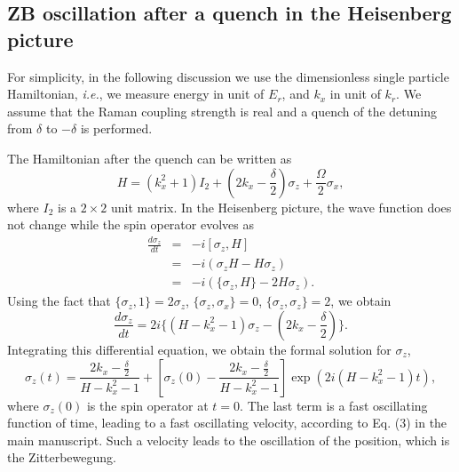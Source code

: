 \documentclass[prl,aps,twocolumn,showpacs,floatfix]{revtex4-1}
\begin{document}
\begin{appendix}
\begin{widetext}

\section{ZB oscillation after a quench in the Heisenberg picture}

For simplicity, in the following discussion we use the dimensionless
single particle Hamiltonian, \textit{i.e.}, we measure energy in
unit of $E_{r}$, and $k_{x}$ in unit of $k_{r}$. We assume that the
Raman coupling strength is real and a quench of the detuning from
$\delta$ to $-\delta$ is performed.

The Hamiltonian after the quench can be written as
\begin{equation}
H=\left( k_{x}^{2}+1\right) I_{2}+(2k_{x}-\frac{\delta }{2})\sigma _{z}+%
\frac{\Omega }{2}\sigma _{x},
\end{equation}%
where $I_{2}$ is a $2\times 2$ unit matrix. In the Heisenberg
picture, the wave function does not change while the spin operator
evolves as
\begin{eqnarray}
\frac{d\sigma _{z}}{dt} &=&-i[\sigma _{z},H] \\
&=&-i(\sigma _{z}H-H\sigma _{z}) \\
&=&-i(\{\sigma _{z},H\}-2H\sigma _{z}).
\end{eqnarray}%
Using the fact that $\{\sigma _{z},1\}=2\sigma _{z}$, $\{\sigma _{z},\sigma
_{x}\}=0$, $\{\sigma _{z},\sigma _{z}\}=2$, we obtain
\begin{equation*}
\frac{d\sigma _{z}}{dt}=2i\{(H-k_{x}^{2}-1)\sigma _{z}-(2k_{x}-\frac{\delta
}{2})\}.
\end{equation*}%
Integrating this differential equation, we obtain the formal solution for $%
\sigma _{z}$,
\begin{equation}
\sigma _{z}(t)=\frac{2k_{x}-\frac{\delta }{2}}{H-k_{x}^{2}-1}+\left[ \sigma
_{z}(0)-\frac{2k_{x}-\frac{\delta }{2}}{H-k_{x}^{2}-1}\right] \exp \left(
2i(H-k_{x}^{2}-1)t\right) ,
\end{equation}%
where $\sigma _{z}(0)$ is the spin operator at $t=0$. The last term
is a fast oscillating function of time, leading to a fast
oscillating velocity, according to Eq. (3) in the main manuscript.
Such a velocity leads to the oscillation of the position, which is
the Zitterbewegung. \newline


\end{widetext}
\end{appendix}
\end{document}
